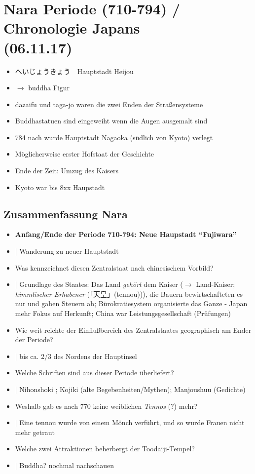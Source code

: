 \documentclass[emulatestandardclasses]{scrartcl}
\begin{document}
\section{Nara Periode (710-794) / Chronologie Japans\\(06.11.17)}

\begin{itemize}
  \item へいじょうきょう　Hauptstadt Heijou
  \item $\rightarrow$ buddha Figur
  \item dazaifu und taga-jo waren die zwei Enden der Straßensysteme
  \item Buddhastatuen sind eingeweiht wenn die Augen ausgemalt sind
  \item 784 nach wurde Hauptstadt Nagaoka (südlich von Kyoto) verlegt
  \item Möglicherweise erster Hofstaat der Geschichte
  \item Ende der Zeit: Umzug des Kaisers
  \item Kyoto war bis 8xx Haupstadt
\end{itemize}

\subsection{Zusammenfassung Nara}

\begin{itemize}
  \item \textbf{Anfang/Ende der Periode 710-794: Neue Haupstadt "`Fujiwara"'}
  \item | Wanderung zu neuer Hauptstadt
  \item Was kennzeichnet diesen Zentralstaat nach chinesischem Vorbild? 
  \item | Grundlage des Staates: Das Land \emph{gehört} dem Kaiser ($\rightarrow$ Land-Kaiser; \emph{himmlischer Erhabener} (「天皇」(tennou))), die Bauern bewirtschafteten es nur und gaben Steuern ab; Bürokratiesystem organisierte das Ganze - Japan mehr Fokus auf Herkunft; China war Leistungsgesellschaft (Prüfungen)
  \item Wie weit reichte der Einflußbereich des Zentralstaates geographisch am Ender der Periode?
  \item | bis ca. 2/3 des Nordens der Hauptinsel
  \item Welche Schriften sind aus dieser Periode überliefert?
  \item | Nihonshoki ; Kojiki (alte Begebenheiten/Mythen); Manjoushuu (Gedichte)
  \item Weshalb gab es nach 770 keine weiblichen \emph{Tennos} (?) mehr?
  \item | Eine tennou wurde von einem Mönch verführt, und so wurde Frauen nicht mehr getraut
  \item Welche zwei Attraktionen beherbergt der Toodaiji-Tempel?
  \item | Buddha? nochmal nachschauen
\end{itemize}
\end{document}
